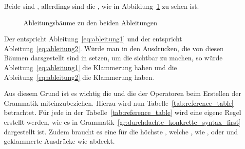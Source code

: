 Beide  sind , allerdings sind die , wie in Abbildung~\ref{fig:ableitungsbäume_zu_den_beiden_ableitungen} zu sehen ist.

\begin{figure}[H]
\begin{transformation}
  \notequal
\end{transformation}
\caption{Ableitungsbäume zu den beiden Ableitungen}
\label{fig:ableitungsbäume_zu_den_beiden_ableitungen}
\end{figure}

Der  entspricht Ableitung~\ref{eq:ableitung1} und der  entspricht Ableitung~\ref{eq:ableitung2}. Würde man in den Ausdrücken, die von diesen Bäumen darsgestellt sind in  setzen, um die  sichtbar zu machen, so würde Ableitung~\ref{eq:ableitung1} die Klammerung  haben und die Ableitung~\ref{eq:ableitung2} die Klammerung  haben.

Aus diesem Grund ist es wichtig die  und die  der Operatoren beim Erstellen der Grammatik miteinzubeziehen. Hierzu wird nun Tabelle~\ref{tab:reference_table} betrachtet. Für jede  in der Tabelle~\ref{tab:reference_table} wird eine eigene Regel erstellt werden, wie es in Grammatik~\ref{gr:durchdachte_konkrette_syntax_first} dargestellt ist. Zudem braucht es eine   für die höchste , welche , wie ,    oder  und geklammerte Ausdrücke wie  abdeckt.

\begin{grammar}
  \toprule
  \midrule
  \midrule
  \bottomrule
\end{grammar}

